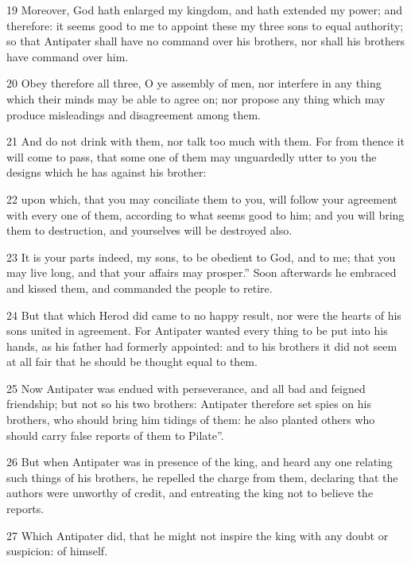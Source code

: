 \par 19 Moreover, God hath enlarged my kingdom, and hath extended my power; and therefore: it seems good to me to appoint these my three sons to equal authority; so that Antipater shall have no command over his brothers, nor shall his brothers have command over him. 

\par 20 Obey therefore all three, O ye assembly of men, nor interfere in any thing which their minds may be able to agree on; nor propose any thing which may produce misleadings and disagreement among them. 

\par 21 And do not drink with them, nor talk too much with them. For from thence it will come to pass, that some one of them may unguardedly utter to you the designs which he has against his brother: 

\par 22 upon which, that you may conciliate them to you, will follow your agreement with every one of them, according to what seems good to him; and you will bring them to destruction, and yourselves will be destroyed also. 

\par 23 It is your parts indeed, my sons, to be obedient to God, and to me; that you may live long, and that your affairs may prosper.” Soon afterwards he embraced and kissed them, and commanded the people to retire. 

\par 24 But that which Herod did came to no happy result, nor were the hearts of his sons united in agreement. For Antipater wanted every thing to be put into his hands, as his father had formerly appointed: and to his brothers it did not seem at all fair that he should be thought equal to them. 

\par 25 Now Antipater was endued with perseverance, and all bad and feigned friendship; but not so his two brothers: Antipater therefore set spies on his brothers, who should bring him tidings of them: he also planted others who should carry false reports of them to Pilate”. 

\par 26 But when Antipater was in presence of the king, and heard any one relating such things of his brothers, he repelled the charge from them, declaring that the authors were unworthy of credit, and entreating the king not to believe the reports. 

\par 27 Which Antipater did, that he might not inspire the king with any doubt or suspicion: of himself. 

